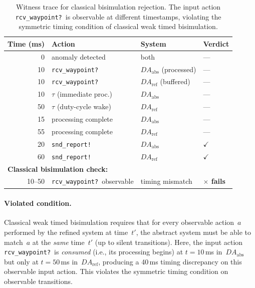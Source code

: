 \documentclass[11pt,a4paper]{article}
\newcommand{\DAabs}{\mathit{DA}_{\mathrm{abs}}}
\newcommand{\DAref}{\mathit{DA}_{\mathrm{ref}}}
\begin{document}
\begin{table}[ht]
\centering
\caption{Witness trace for classical bisimulation rejection.  The
  input action \texttt{rcv\_waypoint?}\ is observable at different
  timestamps, violating the symmetric timing condition of classical
  weak timed bisimulation.}
\label{tab:counterexample}
\small
\begin{tabular}{r l l l}
\toprule
\textbf{Time (ms)} & \textbf{Action} & \textbf{System} & \textbf{Verdict} \\
\midrule
 0   & anomaly detected         & both                     & --- \\
10   & \texttt{rcv\_waypoint?}  & $\DAabs$ (processed) & --- \\
10   & \texttt{rcv\_waypoint?}  & $\DAref$ (buffered)  & --- \\
10   & $\tau$ (immediate proc.) & $\DAabs$             & --- \\
50   & $\tau$ (duty-cycle wake) & $\DAref$             & --- \\
15   & processing complete      & $\DAabs$             & --- \\
55   & processing complete      & $\DAref$             & --- \\
20   & \texttt{snd\_report!}    & $\DAabs$             & $\checkmark$ \\
60   & \texttt{snd\_report!}    & $\DAref$             & $\checkmark$ \\
\midrule
\multicolumn{4}{l}{\textbf{Classical bisimulation check:}} \\
\midrule
10--50 & \texttt{rcv\_waypoint?}\ observable & timing mismatch & \textbf{$\times$ fails} \\
\bottomrule
\end{tabular}
\end{table}

\paragraph{Violated condition.}
Classical weak timed bisimulation requires that for every observable action~$a$
performed by the refined system at time~$t'$, the abstract system must be able
to match~$a$ at the \emph{same} time~$t'$ (up to silent transitions).  Here,
the input action \texttt{rcv\_waypoint?}\ is \emph{consumed} (i.e., its
processing begins) at $t = 10$\,ms in~$\DAabs$ but only at $t = 50$\,ms
in~$\DAref$, producing a 40\,ms timing discrepancy on this observable input
action.  This violates the symmetric timing condition on observable
transitions.
\end{document}
